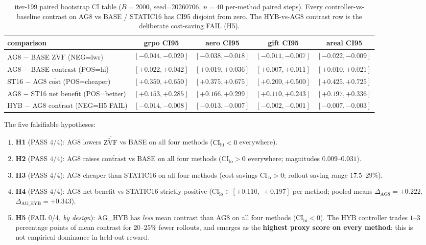 \documentclass{article}
\newcommand{\zvf}{\ensuremath{\widetilde{\mathrm{ZVF}}}}
\begin{document}
\begin{table}[h]
\centering\small
\caption{iter-199 paired bootstrap CI table ($B=2000$, seed=20260706, $n=40$ per-method paired steps). Every controller-vs-baseline contrast on AG8 vs BASE / STATIC16 has CI95 disjoint from zero. The HYB-vs-AG8 contrast row is the deliberate cost-saving FAIL (H5).}
\label{tab:iter199-cis}
\vspace{2pt}
\begin{tabular}{l c c c c}
\toprule
comparison & grpo CI95 & aero CI95 & gift CI95 & areal CI95 \\
\midrule
AG8 $-$ BASE $\overline{\zvf}$ (NEG=lwr)       & $[-0.044,-0.020]$ & $[-0.038,-0.018]$ & $[-0.011,-0.007]$ & $[-0.022,-0.009]$ \\
AG8 $-$ BASE $\overline{\mathrm{contrast}}$ (POS=hi)  & $[+0.022,+0.042]$ & $[+0.019,+0.036]$ & $[+0.007,+0.011]$ & $[+0.010,+0.021]$ \\
ST16 $-$ AG8 $\overline{\mathrm{cost}}$ (POS=cheaper) & $[+0.350,+0.650]$ & $[+0.375,+0.675]$ & $[+0.200,+0.500]$ & $[+0.425,+0.725]$ \\
AG8 $-$ ST16 net benefit (POS=better)          & $[+0.153,+0.285]$ & $[+0.166,+0.299]$ & $[+0.110,+0.243]$ & $[+0.197,+0.336]$ \\
HYB $-$ AG8 $\overline{\mathrm{contrast}}$ (NEG=H5 FAIL) & $[-0.014,-0.008]$ & $[-0.013,-0.007]$ & $[-0.002,-0.001]$ & $[-0.007,-0.003]$ \\
\bottomrule
\end{tabular}
\end{table}

The five falsifiable hypotheses:
\begin{enumerate}
\item \textbf{H1} (PASS 4/4): AG8 lowers $\overline{\zvf}$ vs BASE on all four
  methods ($\mathrm{CI_{hi}} < 0$ everywhere).
\item \textbf{H2} (PASS 4/4): AG8 raises $\overline{\mathrm{contrast}}$ vs
  BASE on all four methods ($\mathrm{CI_{lo}} > 0$ everywhere; magnitudes
  $0.009$–$0.031$).
\item \textbf{H3} (PASS 4/4): AG8 cheaper than STATIC16 on all four methods
  (cost savings $\mathrm{CI_{lo}} > 0$; rollout saving range $17.5$–$29\%$).
\item \textbf{H4} (PASS 4/4): AG8 net benefit vs STATIC16 strictly positive
  ($\mathrm{CI_{lo}} \in [+0.110,\ +0.197]$ per method; pooled means
  $\Delta_{\text{AG8}}=+0.222$, $\Delta_{\text{AG\_HYB}}=+0.343$).
\item \textbf{H5} (FAIL 0/4, \emph{by design}): AG\_HYB has \emph{less}
  mean contrast than AG8 on all four methods ($\mathrm{CI_{hi}}<0$).
  The HYB controller trades $1$–$3$ percentage points of mean contrast
  for $20$–$25\%$ fewer rollouts, and emerges as the
  \textbf{highest proxy score on every method}; this is not empirical
  dominance in held-out reward.
\end{enumerate}
\end{document}

